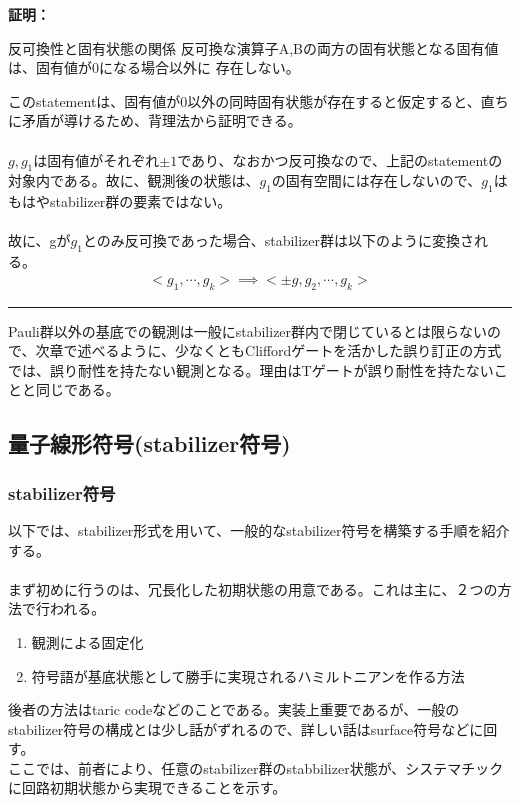 \documentclass[a4paper,10.5pt]{article}
\numberwithin{equation}{section}
\newenvironment{proofbox}
{\begin{prooflabel}\textbf{証明：}\end{prooflabel}\vspace{0.8em}}
{\par\vspace{1em}\hrule\vspace{1em}}
\begin{document}
\begin{proofbox}
\begin{enumerate}
    \begin{resultbox}{反可換性と固有状態の関係}
    反可換な演算子A,Bの両方の固有状態となる固有値は、固有値が0になる場合以外に
    存在しない。
    \end{resultbox}
   このstatementは、固有値が0以外の同時固有状態が存在すると仮定すると、直ちに矛盾が導けるため、背理法から証明できる。\\
   \\
   $g,g_{1}$は固有値がそれぞれ$\pm1$であり、なおかつ反可換なので、上記のstatementの対象内である。故に、観測後の状態は、$g_{1}$の固有空間には存在しないので、$g_{1}$はもはやstabilizer群の要素ではない。\\
   \\
    故に、gが$g_{1}$とのみ反可換であった場合、stabilizer群は以下のように変換される。
    \begin{align*}
        <g_{1},\cdots ,g_{k}> \implies <\pm g,g_{2},\cdots ,g_{k}>
    \end{align*}
   \end{enumerate}
\end{proofbox}
Pauli群以外の基底での観測は一般にstabilizer群内で閉じているとは限らないので、次章で述べるように、少なくともCliffordゲートを活かした誤り訂正の方式では、誤り耐性を持たない観測となる。理由はTゲートが誤り耐性を持たないことと同じである。

\subsection{量子線形符号(stabilizer符号)}
\subsubsection{stabilizer符号}
以下では、stabilizer形式を用いて、一般的なstabilizer符号を構築する手順を紹介する。\\
\\
まず初めに行うのは、冗長化した初期状態の用意である。これは主に、２つの方法で行われる。
\begin{enumerate}
    \item 観測による固定化
    \item 符号語が基底状態として勝手に実現されるハミルトニアンを作る方法
\end{enumerate}
後者の方法はtaric codeなどのことである。実装上重要であるが、一般のstabilizer符号の構成とは少し話がずれるので、詳しい話はsurface符号などに回す。\\
ここでは、前者により、任意のstabilizer群のstabbilizer状態が、システマチックに回路初期状態から実現できることを示す。
\end{document}
